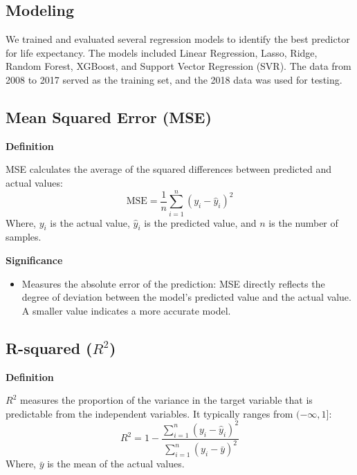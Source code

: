 \documentclass{article}
\begin{document}
\subsection{Modeling}
\label{ssec:modeling_life}

We trained and evaluated several regression models to identify the best predictor for life expectancy. The models included Linear Regression, Lasso, Ridge, Random Forest, XGBoost, and Support Vector Regression (SVR). The data from 2008 to 2017 served as the training set, and the 2018 data was used for testing.

\subsection*{Mean Squared Error (MSE)}

\textbf{Definition}

MSE calculates the average of the squared differences between predicted and actual values:
\begin{equation}
    \text{MSE} = \frac{1}{n} \sum_{i=1}^{n} (y_i - \hat{y}_i)^2
\end{equation}
Where, $y_i$ is the actual value, $\hat{y}_i$ is the predicted value, and $n$ is the number of samples.

\textbf{Significance}
\begin{itemize}
    \item Measures the absolute error of the prediction: MSE directly reflects the degree of deviation between the model's predicted value and the actual value. A smaller value indicates a more accurate model.
\end{itemize}

\subsection*{ R-squared ($R^2$)}

\textbf{Definition}

$R^2$ measures the proportion of the variance in the target variable that is predictable from the independent variables. It typically ranges from $(-\infty, 1]$:
\begin{equation}
    R^2 = 1 - \frac{\sum_{i=1}^{n} (y_i - \hat{y}_i)^2}{\sum_{i=1}^{n} (y_i - \bar{y})^2}
\end{equation}
Where, $\bar{y}$ is the mean of the actual values.
\end{document}
